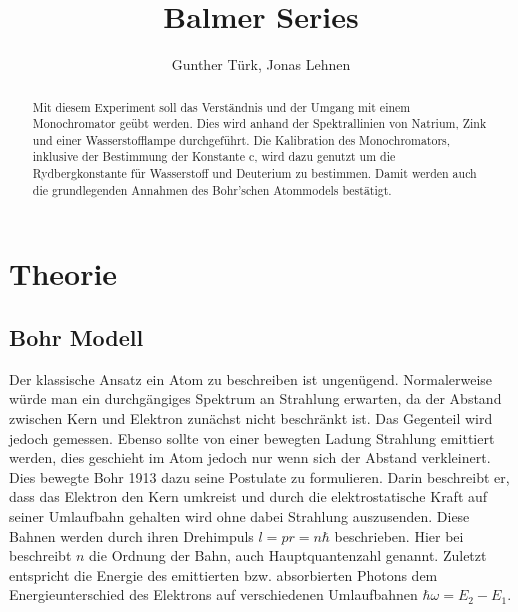 \documentclass[]{article}
\title{Balmer Series}
\author{Gunther T\"urk, Jonas Lehnen}
\begin{document}
\maketitle
\begin{abstract}
Mit diesem Experiment soll das Verständnis und der Umgang mit einem Monochromator geübt werden. Dies wird anhand der Spektrallinien von Natrium, Zink und einer Wasserstofflampe durchgeführt. Die Kalibration des Monochromators, inklusive der Bestimmung der Konstante c, wird dazu genutzt um die Rydbergkonstante für Wasserstoff und Deuterium zu bestimmen. Damit werden auch die grundlegenden Annahmen des Bohr'schen Atommodels bestätigt.

\end{abstract}

\tableofcontents

\newpage
\section{Theorie}
\subsection{Bohr Modell}
Der klassische Ansatz ein Atom zu beschreiben ist ungenügend. Normalerweise würde man ein durchgängiges Spektrum an Strahlung erwarten, da der Abstand zwischen Kern und Elektron zunächst nicht beschränkt ist. Das Gegenteil wird jedoch gemessen. Ebenso sollte von einer bewegten Ladung Strahlung emittiert werden, dies geschieht im Atom jedoch nur wenn sich der Abstand verkleinert. Dies bewegte Bohr 1913 dazu seine Postulate zu formulieren. Darin beschreibt er, dass das Elektron den Kern umkreist und durch die elektrostatische Kraft auf seiner Umlaufbahn gehalten wird ohne dabei Strahlung auszusenden. Diese Bahnen werden durch ihren Drehimpuls $l = pr = n\hbar$ beschrieben. Hier bei beschreibt $n$ die Ordnung der Bahn, auch Hauptquantenzahl genannt. Zuletzt entspricht die Energie des emittierten bzw. absorbierten Photons dem Energieunterschied des Elektrons auf verschiedenen Umlaufbahnen $ \hbar \omega = E_2 - E_1$. 
\end{document}
